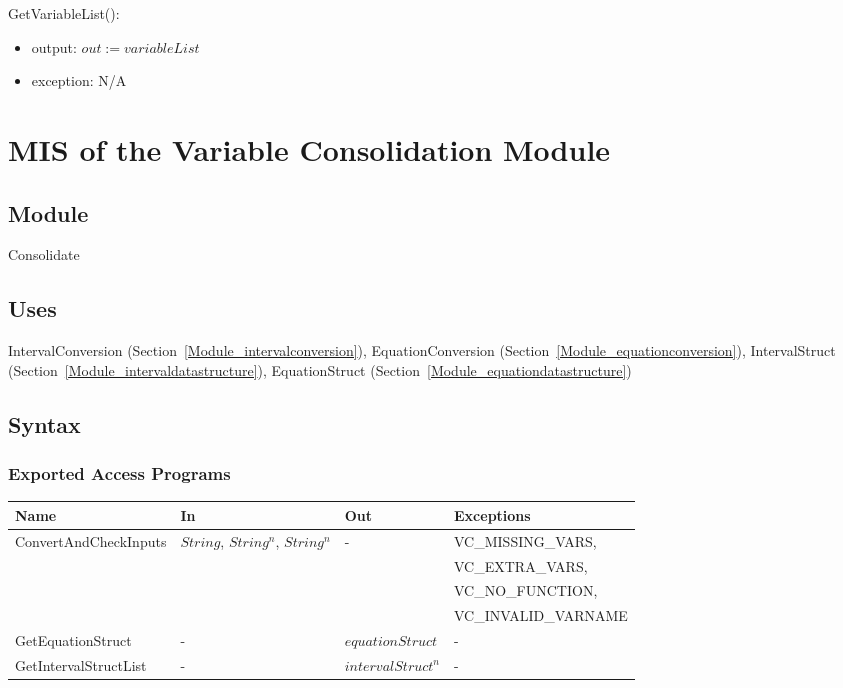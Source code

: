 \documentclass[12pt, titlepage]{article}
\begin{document}
\noindent GetVariableList():
\begin{itemize}
	\item output: $out := variableList$
	\item exception: N/A
\end{itemize}

\newpage

\section{MIS of the Variable Consolidation Module} 
\label{Module_variableconsolidation}

\subsection{Module}

Consolidate

\subsection{Uses}

IntervalConversion (Section~\ref{Module_intervalconversion}), 
EquationConversion (Section~\ref{Module_equationconversion}), IntervalStruct 
(Section~\ref{Module_intervaldatastructure}), EquationStruct 
(Section~\ref{Module_equationdatastructure})


\subsection{Syntax}

\subsubsection{Exported Access Programs}

\begin{center}
	\begin{tabular}{p{4.3cm} p{2.3cm} p{3cm} p{5cm}}
		\hline
		\textbf{Name} & \textbf{In} & \textbf{Out} & \textbf{Exceptions} \\
		\hline
		\multirow{4}{4.3cm}{ConvertAndCheckInputs} & 
		\multirow{4}{2.3cm}{$String$, $String^n$, $String^n$} & 
		\multirow{4}{3cm}{-} & VC\_MISSING\_VARS, \\
		& & & VC\_EXTRA\_VARS, \\
		& & & VC\_NO\_FUNCTION, \\
		& & & VC\_INVALID\_VARNAME \\
		GetEquationStruct & - & $equationStruct$ & - \\
		GetIntervalStructList & - & $intervalStruct^n$ & - \\
		\hline
	\end{tabular}
\end{center}
\end{document}
